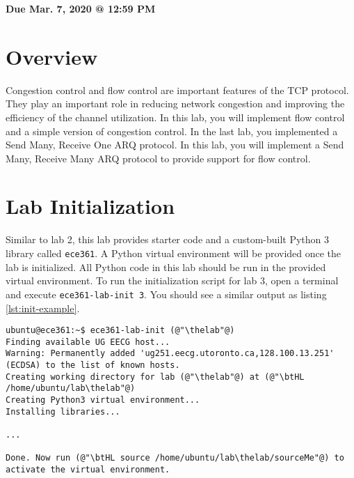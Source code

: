 \documentclass[11pt]{article}
\makeatletter
\def\thelab{3}
\def\datedue{Mar. 7, 2020 @ 12:59 PM}
\makeatother
\begin{document}
\maketitle \thispagestyle{fancy}

\hfill {\large \textbf{Due \datedue}}


\section{Overview}
\label{sec:overview}
Congestion control and flow control are important features of the TCP protocol. They play an important role in reducing network congestion and improving the efficiency of the channel utilization. In this lab, you will implement flow control and a simple version of congestion control. In the last lab, you implemented a Send Many, Receive One ARQ protocol. In this lab, you will implement a Send Many, Receive Many ARQ protocol to provide support for flow control.

\section{Lab Initialization}
\label{subsec:lab-init}
Similar to lab 2, this lab provides starter code and a custom-built Python 3 library called \texttt{ece361}. A Python virtual environment will be provided once the lab is initialized. All Python code in this lab should be run in the provided virtual environment. To run the initialization script for lab 3, open a terminal and execute \texttt{ece361-lab-init 3}. You should see a similar output as listing \ref{lst:init-example}.

\begin{lstlisting}[style=ece361shell, caption={Initializing lab \thelab.}, label={lst:init-example}]
ubuntu@ece361:~$ ece361-lab-init (@"\thelab"@)
Finding available UG EECG host...
Warning: Permanently added 'ug251.eecg.utoronto.ca,128.100.13.251' (ECDSA) to the list of known hosts.
Creating working directory for lab (@"\thelab"@) at (@"\btHL /home/ubuntu/lab\thelab"@)
Creating Python3 virtual environment...
Installing libraries...

...

Done. Now run (@"\btHL source /home/ubuntu/lab\thelab/sourceMe"@) to activate the virtual environment.
\end{lstlisting}
\end{document}
